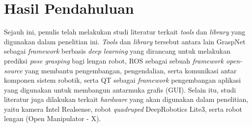 \section{Hasil Pendahuluan}
Sejauh ini, penulis telah melakukan studi literatur terkait \emph{tools} dan \emph{library} yang digunakan dalam penelitian ini.
\emph{Tools} dan \emph{library} tersebut antara lain GraspNet sebagai \emph{framework} berbasis \emph{deep learning} yang dirancang untuk
melakukan prediksi \emph{pose grasping} bagi lengan robot, ROS sebagai sebuah \emph{framework open-source} yang membantu pengembangan,
pengendalian, serta komunikasi antar komponen sistem robotik, serta QT sebagai \emph{framework} pengembangan aplikasi yang digunakan
untuk membangun antarmuka grafis (GUI). Selain itu, studi literatur juga dilakukan terkait \emph{hardware} yang akan digunakan dalam penelitian,
yaitu kamera Intel Realsense, robot \emph{quadruped} DeepRobotics Lite3, serta robot lengan (Open Manipulator - X).
